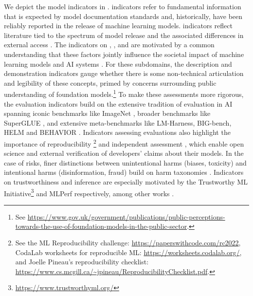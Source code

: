 \noindent 
We depict the model indicators in .
\modelbasics indicators refer to fundamental information that is expected by model documentation standards \citep{mitchell2019model, crisan2022interactive, bommasani2023ecosystem} and, historically, have been reliably reported in the release of machine learning models. 
\modelaccess indicators reflect literature tied to the spectrum of model release and the associated differences in external access \citep{solaiman2019release, sastry2021release, shevlane2022structured, liang2022norms, solaiman2023gradient}. 
The indicators on \capabilities, \limitations, \risks and \modelmitigations are motivated by a common understanding that these factors jointly influence the societal impact of machine learning models and AI systems \citep{tabassi2023airmf, weidinger2023sociotechnical}. 
For these subdomains, the description and demonstration indicators gauge whether there is some non-technical articulation and legibility of these concepts, primed by concerns surrounding public understanding of foundation models.\footnote{See \url{https://www.gov.uk/government/publications/public-perceptions-towards-the-use-of-foundation-models-in-the-public-sector}.} 
To make these assessments more rigorous, the evaluation indicators build on the extensive tradition of evaluation in AI spanning iconic benchmarks like ImageNet \citep{deng2009imagenet}, broader benchmarks like SuperGLUE \cite{wang2019superglue}, and extensive meta-benchmarks like LM-Harness, BIG-bench, HELM and BEHAVIOR \citep{gao2021harness, srivastava2022bigbench, liang2023holistic, srivastava2021behavior}. 
Indicators assessing evaluations also highlight the importance of reproducibility \citep{lipton2019troubling, kapoor2023reforms, kapoor2023leakage}\footnote{See the ML Reproducibility challenge: \url{https://paperswithcode.com/rc2022}, CodaLab worksheets for reproducible ML: \url{https://worksheets.codalab.org/}, and Joelle Pineau's reproducibility checklist: \url{https://www.cs.mcgill.ca/~jpineau/ReproducibilityChecklist.pdf}.} and independent assessment \citep{sandvig2014auditing, raji2019actionable, metaxa2021audit, costanzachock2022audit, raji2022audit, raji2022mozilla, lam2022user, weidinger2023sociotechnical}, which enable open science and external verification of developers' claims about their models.
In the case of risks, finer distinctions between unintentional harms (\eg biases, toxicity) and intentional harms (\eg disinformation, fraud) build on harm taxonomies \citep{bender2021dangers, bommasani2021opportunities, weidinger2021ethical, nist2023airmf, weidinger2023sociotechnical}.
Indicators on trustworthiness and inference are especially motivated by the Trustworthy ML Initiative\footnote{\url{https://www.trustworthyml.org/}} and MLPerf \citep{reddi2020mlperf} respectively, among other works \citep{brundage2020toward, cammarota2020trustworthy, kumar2020trustworthy, liu2022trustworthy, shneiderman2020bridging, patterson2021carbon, narayanan2023cheaply}.

